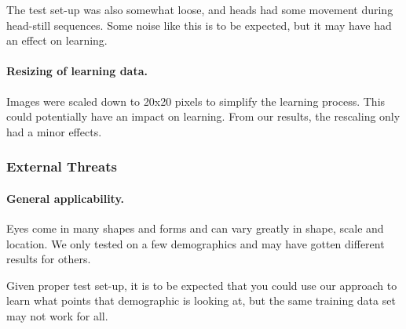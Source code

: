 The test set-up was also somewhat loose, and heads had some movement during head-still sequences.
Some noise like this is to be expected, but it may have had an effect on learning.

\paragraph{Resizing of learning data.}
Images were scaled down to 20x20 pixels to simplify the learning process.
This could potentially have an impact on learning.
From our results, the rescaling only had a minor effects.

\subsubsection{External Threats}
\paragraph{General applicability.}
Eyes come in many shapes and forms and can vary greatly in shape, scale and location.
We only tested on a few demographics and may have gotten different results for others.

Given proper test set-up, it is to be expected that you could use our approach to learn what points that demographic is looking at, but the same training data set may not work for all.